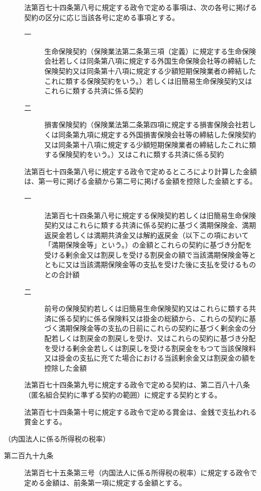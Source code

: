 \documentclass[twocolumn,a4j,10pt]{ltjtarticle}
\begin{document}
\begin{description}
\item[]法第百七十四条第八号に規定する政令で定める事項は、次の各号に掲げる契約の区分に応じ当該各号に定める事項とする。
\begin{description}
\item[一]生命保険契約（保険業法第二条第三項（定義）に規定する生命保険会社若しくは同条第八項に規定する外国生命保険会社等の締結した保険契約又は同条第十八項に規定する少額短期保険業者の締結したこれに類する保険契約をいう。）若しくは旧簡易生命保険契約又はこれらに類する共済に係る契約
\item[二]損害保険契約（保険業法第二条第四項に規定する損害保険会社若しくは同条第九項に規定する外国損害保険会社等の締結した保険契約又は同条第十八項に規定する少額短期保険業者の締結したこれに類する保険契約をいう。）又はこれに類する共済に係る契約
\end{description}
\item[]法第百七十四条第八号に規定する政令で定めるところにより計算した金額は、第一号に掲げる金額から第二号に掲げる金額を控除した金額とする。
\begin{description}
\item[一]法第百七十四条第八号に規定する保険契約若しくは旧簡易生命保険契約又はこれらに類する共済に係る契約に基づく満期保険金、満期返戻金若しくは満期共済金又は解約返戻金（以下この項において「満期保険金等」という。）の金額とこれらの契約に基づき分配を受ける剰余金又は割戻しを受ける割戻金の額で当該満期保険金等とともに又は当該満期保険金等の支払を受けた後に支払を受けるものとの合計額
\item[二]前号の保険契約若しくは旧簡易生命保険契約又はこれらに類する共済に係る契約に係る保険料又は掛金の総額から、これらの契約に基づく満期保険金等の支払の日前にこれらの契約に基づく剰余金の分配若しくは割戻金の割戻しを受け、又はこれらの契約に基づき分配を受ける剰余金若しくは割戻しを受ける割戻金をもつて当該保険料又は掛金の支払に充てた場合における当該剰余金又は割戻金の額を控除した金額
\end{description}
\item[]法第百七十四条第九号に規定する政令で定める契約は、第二百八十八条（匿名組合契約に準ずる契約の範囲）に規定する契約とする。
\item[]法第百七十四条第十号に規定する政令で定める賞金は、金銭で支払われる賞金とする。
\end{description}
\noindent\hspace{10pt}（内国法人に係る所得税の税率）
\begin{description}
\item[第二百九十九条]法第百七十五条第三号（内国法人に係る所得税の税率）に規定する政令で定める金額は、前条第一項に規定する金額とする。
\end{description}
\end{document}
